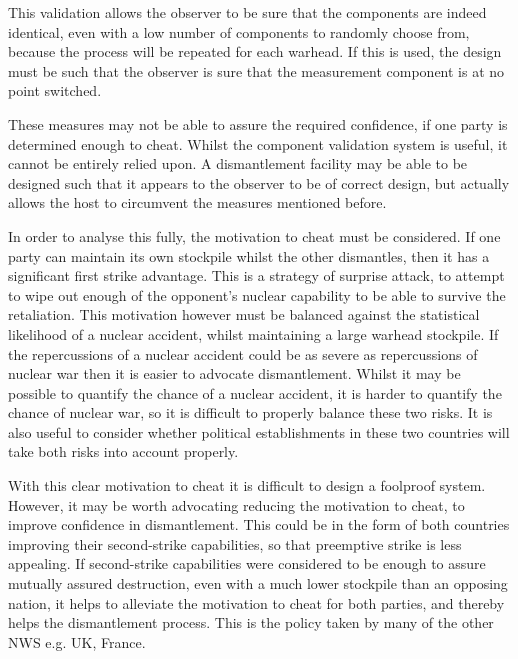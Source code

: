 \documentclass[twoside,titlepage,11pt,twocolumn,a4paper]{article}
\begin{document}
This validation allows the observer to be sure that the components are
indeed identical, even with a low number of components to randomly
choose from, because the process will be repeated for each warhead. If
this is used, the design must be such that the observer is sure that
the measurement component is at no point switched.

These measures may not be able to assure the required confidence, if
one party is determined enough to cheat. Whilst the component
validation system is useful, it cannot be entirely relied upon. A
dismantlement facility may be able to be designed such that it appears
to the observer to be of correct design, but actually allows the host
to circumvent the measures mentioned before.

In order to analyse this fully, the motivation to cheat must be
considered.  If one party can maintain its own stockpile whilst the
other dismantles, then it has a significant first strike
advantage. This is a strategy of surprise attack, to attempt to wipe
out enough of the opponent's nuclear capability to be able to survive
the retaliation. This motivation however must be balanced against the
statistical likelihood of a nuclear accident, whilst maintaining a
large warhead stockpile. If the repercussions of a nuclear accident
could be as severe as repercussions of nuclear war then it is easier
to advocate dismantlement. Whilst it may be possible to quantify the
chance of a nuclear accident, it is harder to quantify the chance of
nuclear war, so it is difficult to properly balance these two
risks. It is also useful to consider whether political establishments
in these two countries will take both risks into account properly.

With this clear motivation to cheat it is difficult to design a
foolproof system. However, it may be worth advocating reducing the
motivation to cheat, to improve confidence in dismantlement. This
could be in the form of both countries improving their second-strike
capabilities, so that preemptive strike is less appealing. If
second-strike capabilities were considered to be enough to assure
mutually assured destruction, even with a much lower stockpile than an
opposing nation, it helps to alleviate the motivation to cheat for
both parties, and thereby helps the dismantlement process. This is the
policy taken by many of the other NWS e.g. UK, France.

\renewcommand{\refname}{\vspace*{-1.5em}\section{References}\vspace*{-1em}}


\end{document}
